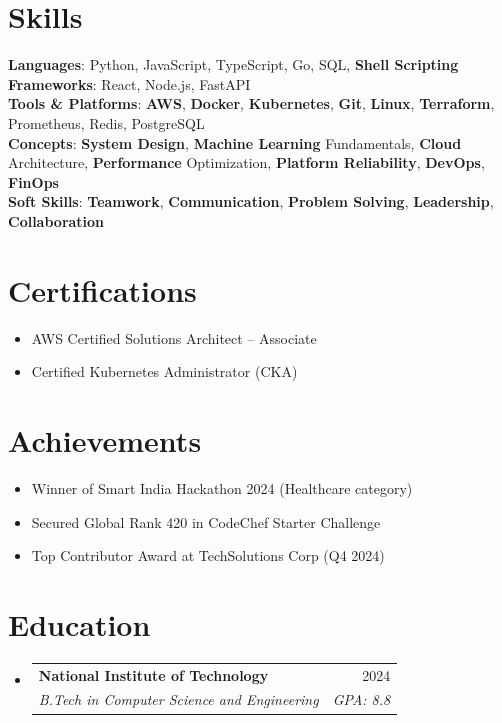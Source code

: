 \documentclass[letterpaper,11pt]{article}
\makeatletter
\newcommand{\resumeItem}[1]{\item\small{#1 \vspace{-2pt}}}
\newcommand{\resumeSubheading}[4]{\vspace{-2pt}\item\begin{tabular*}{0.97\textwidth}[t]{l@{\extracolsep{\fill}}r}\textbf{#1} & #2 \\\textit{\small#3} & \textit{\small #4} \\\end{tabular*}\vspace{-7pt}}
\newcommand{\resumeSubHeadingListStart}{\begin{itemize}[leftmargin=0.15in, label={}]}
\newcommand{\resumeSubHeadingListEnd}{\end{itemize}}
\makeatother
\begin{document}
\section{Skills}
\begin{itemize}[leftmargin=0.15in, label={}]
    \small{\item
    \textbf{Languages}{: Python, JavaScript, TypeScript, Go, SQL, \textbf{Shell Scripting}} \\
    \textbf{Frameworks}{: React, Node.js, FastAPI} \\
    \textbf{Tools \& Platforms}{: \textbf{AWS}, \textbf{Docker}, \textbf{Kubernetes}, \textbf{Git}, \textbf{Linux}, \textbf{Terraform}, Prometheus, Redis, PostgreSQL} \\
    \textbf{Concepts}{: \textbf{System Design}, \textbf{Machine Learning} Fundamentals, \textbf{Cloud} Architecture, \textbf{Performance} Optimization, \textbf{Platform Reliability}, \textbf{DevOps}, \textbf{FinOps}} \\
    \textbf{Soft Skills}{: \textbf{Teamwork}, \textbf{Communication}, \textbf{Problem Solving}, \textbf{Leadership}, \textbf{Collaboration}}
    }
\end{itemize}

\section{Certifications}
\resumeSubHeadingListStart
    \resumeItem{AWS Certified Solutions Architect – Associate}
    \resumeItem{Certified Kubernetes Administrator (CKA)}
\resumeSubHeadingListEnd

\section{Achievements}
\resumeSubHeadingListStart
    \resumeItem{Winner of Smart India Hackathon 2024 (Healthcare category)}
    \resumeItem{Secured Global Rank 420 in CodeChef Starter Challenge}
    \resumeItem{Top Contributor Award at TechSolutions Corp (Q4 2024)}
\resumeSubHeadingListEnd

\section{Education}
\resumeSubHeadingListStart
    \resumeSubheading
      {National Institute of Technology}{2024}
      {B.Tech in Computer Science and Engineering}{GPA: 8.8}
\resumeSubHeadingListEnd
\end{document}
